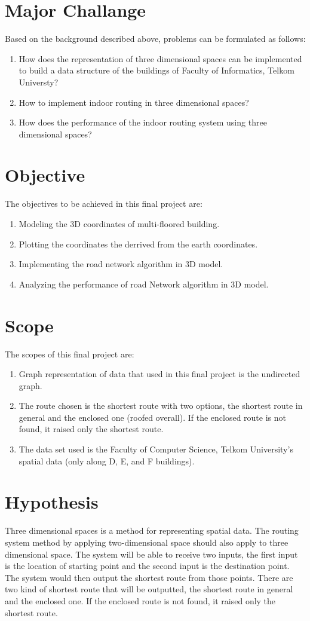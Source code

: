 \section{Major Challange}
Based on the background described above, problems can be formulated as follows:
\begin{enumerate}
    \item How does the representation of three dimensional spaces can be implemented to build a data structure of the buildings of Faculty of Informatics, Telkom Universty?
    \item How to implement indoor routing in three dimensional spaces?
    \item How does the performance of the indoor routing system using three dimensional spaces?
\end{enumerate}
\section{Objective}
The objectives to be achieved in this final project are:
\begin{enumerate}
    \item Modeling the 3D coordinates of multi-floored building.
    \item Plotting the coordinates the derrived from the earth coordinates.
    \item Implementing the road network algorithm in 3D model.
    \item Analyzing the performance of road Network algorithm in 3D model.
\end{enumerate}
\section{Scope}
The scopes of this final project are:
\begin{enumerate}
	\item Graph representation of data that used in this final project is the undirected graph.
	\item The route chosen is the shortest route with two options, the shortest route in general and the enclosed one (roofed overall). If the enclosed route is not found, it raised only the shortest route.
	\item The data set used is the Faculty of Computer Science, Telkom University’s spatial data (only along D, E, and F buildings).
\end{enumerate}
\section{Hypothesis}
Three dimensional spaces is a method for representing spatial data. The routing system method by applying two-dimensional space should also apply to three dimensional space. The system will be able to receive two inputs, the first input is the location of starting point and the second input is the destination point. The system would then output the shortest route from those points. There are two kind of shortest route that will be outputted, the shortest route in general and the enclosed one. If the enclosed route is not found, it raised only the shortest route.
